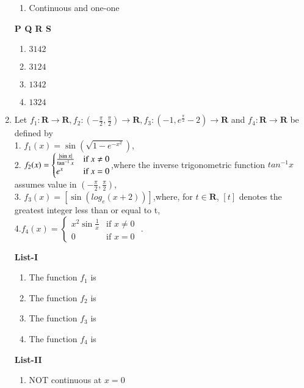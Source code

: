 \documentclass[journal,12pt,twocolumn]{IEEEtran}
\theoremstyle{remark}
\begin{document}
\begin{enumerate}
\begin{multicols}{2}
\begin{enumerate}[label=\arabic*.]
					\item  Continuous and one-one
				\end{enumerate}
		\end{multicols}
			\textbf{   P Q R S}
			\begin{enumerate}[label=(\alph*)]
				\item $ 3 1 4 2$
				\item$ 3 1 2 4$
				\item $1 3 4 2$ 
				\item $1 3 2 4$
			\end{enumerate}
            \item Let $f_1: \textbf{R}\rightarrow \textbf{R},f_2:(-\frac{\pi}{2},\frac{\pi}{2})\rightarrow \textbf{R}, f_3:(-1,e^\frac{\pi}{2}-2)\rightarrow \textbf{R}$ and $f_4: \textbf{R}\rightarrow \textbf{R}$ be defined by \\
            1. $f_1(x)=\sin({\sqrt{1-e^{-x^2}}})$, \\
            2. $f_2(x) =
             \begin{cases}
		 \frac{\left\vert\sin{x}\right\vert}{\tan^{-1}x} & \text{if } x \neq 0 \\
                 e^x & \text{if } x = 0 
                 \end{cases}$,where the inverse trigonometric function $tan^{-1}x $ assumes value in $(-\frac{\pi}{2},\frac{\pi}{2})$,\\
            3. $f_3(x)=[\sin({log_e(x+2)})]$,where, for $t\in \textbf{R}$, $[t]$ denotes the greatest integer less than or equal to t, \\
            4.$f_4(x) =
        \begin{cases}
                 x^2\sin{\frac{1}{x}} & \text{if } x \neq 0 \\
                 0 & \text{if } x = 0 
                 \end{cases}$ .
                 \begin{multicols}{2} 
				\textbf{List-I} 
				\begin{enumerate}[label=\Alph*., start=16]
					\item The function $f_1$ is
					\item The function $f_2$ is 
					\item The function $f_3$ is 
					\item The function $f_4$ is
				\end{enumerate}
				\columnbreak
				\textbf{List-II}
				\begin{enumerate}[label=\arabic*.]
					\item  NOT continuous at $x = 0$ 

\end{enumerate}
\end{multicols}
\end{enumerate}
\end{document}

